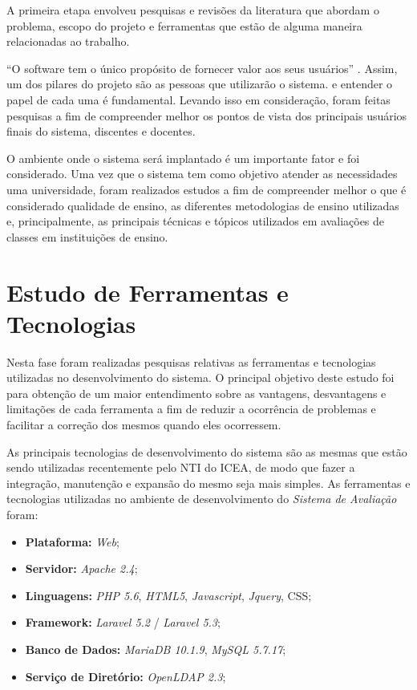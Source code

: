 \documentclass[
  12pt,       %
  openright,      %
  oneside,      %
  a4paper,      %
  english,      %
  french,        %
  spanish,     %
  brazil        %
  ]{abntex2-decsi}
\begin{document}
    A primeira etapa envolveu pesquisas e revisões da literatura que abordam o problema, escopo do projeto e ferramentas que estão de alguma maneira relacionadas ao trabalho. 

    ``O software tem o único propósito de fornecer valor aos seus usuários'' \cite[tradução nossa]{hooker:1996}. Assim, um dos pilares do projeto são as pessoas que utilizarão o sistema.  e entender o papel de cada uma é fundamental. Levando isso em consideração, foram feitas pesquisas a fim de compreender melhor os pontos de vista dos principais usuários finais do sistema, discentes e docentes.

    O ambiente onde o sistema será implantado é um importante fator e foi considerado. Uma vez que o sistema tem como objetivo atender as necessidades uma universidade, foram realizados estudos a fim de compreender melhor o que é considerado qualidade de ensino, as diferentes metodologias de ensino utilizadas e, principalmente, as principais técnicas e tópicos utilizados em avaliações de classes em instituições de ensino.

    \section{Estudo de Ferramentas e Tecnologias}

    Nesta fase foram realizadas pesquisas relativas as ferramentas e tecnologias utilizadas no desenvolvimento do sistema. O principal objetivo deste estudo foi para obtenção de um maior entendimento sobre as vantagens, desvantagens e limitações de cada ferramenta a fim de reduzir a ocorrência de problemas e facilitar a correção dos mesmos quando eles ocorressem.

    As principais tecnologias de desenvolvimento do sistema são as mesmas que estão sendo utilizadas recentemente pelo NTI do ICEA, de modo que fazer a integração, manutenção e expansão do mesmo seja mais simples. As ferramentas e tecnologias utilizadas no ambiente de desenvolvimento do \textit{Sistema de Avaliação} foram:

    \begin{itemize}
        \item \textbf{Plataforma:} \textit{Web};
        \item \textbf{Servidor:} \textit{Apache 2.4};
        \item \textbf{Linguagens:} \textit{PHP 5.6}, \textit{HTML5}, \textit{Javascript}, \textit{Jquery}, CSS;
        \item \textbf{Framework:} \textit{Laravel 5.2} / \textit{Laravel 5.3};
        \item \textbf{Banco de Dados:} \textit{MariaDB 10.1.9},\textit{ MySQL 5.7.17};
        \item \textbf{Serviço de Diretório:} \textit{OpenLDAP 2.3};
    \end{itemize}
\end{document}
